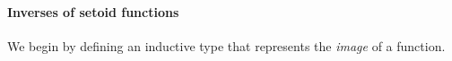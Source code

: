 \begin{code}
%
\>[18]\AgdaSymbol{\{}\AgdaSpace{}%
\AgdaSpace{}%
\AgdaSymbol{=}\AgdaSpace{}%
\AgdaSymbol{(}\AgdaSpace{}%
\AgdaSymbol{)}\AgdaSpace{}%
\AgdaSpace{}%
\AgdaSymbol{(}\AgdaSpace{}%
\AgdaSymbol{)}\<%
\\
%
\>[18]\AgdaSymbol{;}\AgdaSpace{}%
\AgdaSpace{}%
\AgdaSymbol{=}\AgdaSpace{}%
\AgdaSymbol{(}\AgdaSpace{}%
\AgdaSymbol{)}\AgdaSpace{}%
\AgdaSpace{}%
\AgdaSymbol{(}\AgdaSpace{}%
\AgdaSymbol{)}\AgdaSpace{}%
\AgdaSymbol{\}}\<%
\end{code}
\fi

\paragraph*{Inverses of setoid functions}
We begin by defining an inductive type that represents the \emph{image} of a function.

